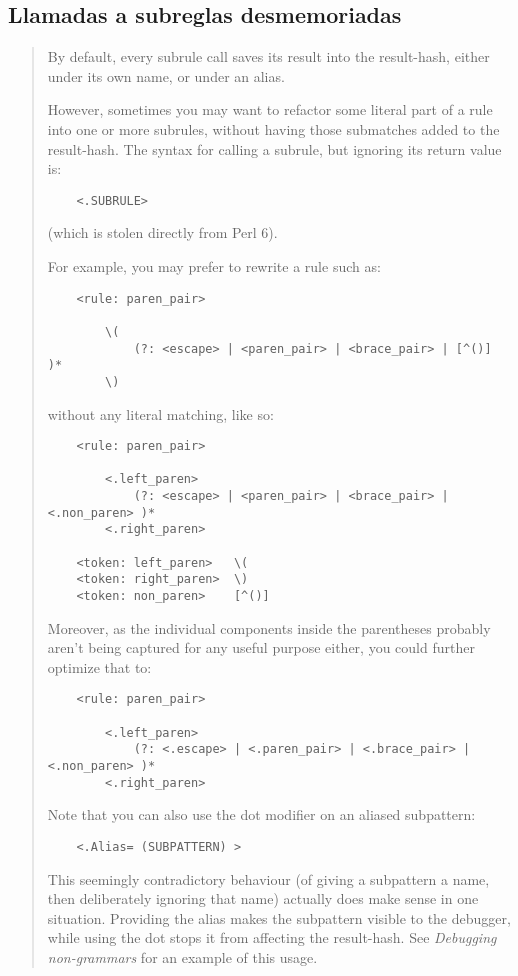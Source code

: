 \subsection{Llamadas a subreglas desmemoriadas}

\begin{it}\begin{quotation}
By default, every subrule call saves its result into the result-hash,
either under its own name, or under an alias.

However, sometimes you may want to refactor some literal part of a rule
into one or more subrules, without having those submatches added to the
result-hash. The syntax for calling a subrule, but ignoring its return
value is:

\begin{verbatim}
    <.SUBRULE>
\end{verbatim}

(which is stolen directly from Perl 6).

For example, you may prefer to rewrite a rule such as:

\begin{verbatim}
    <rule: paren_pair> 

        \( 
            (?: <escape> | <paren_pair> | <brace_pair> | [^()] )*
        \)
\end{verbatim}

without any literal matching, like so:

\begin{verbatim}
    <rule: paren_pair> 

        <.left_paren>
            (?: <escape> | <paren_pair> | <brace_pair> | <.non_paren> )*
        <.right_paren>
    
    <token: left_paren>   \(
    <token: right_paren>  \)
    <token: non_paren>    [^()]
\end{verbatim}

Moreover, as the individual components inside the parentheses probably
aren't being captured for any useful purpose either, you could further
optimize that to:

\begin{verbatim}
    <rule: paren_pair> 

        <.left_paren>
            (?: <.escape> | <.paren_pair> | <.brace_pair> | <.non_paren> )*
        <.right_paren>
\end{verbatim}

Note that you can also use the dot modifier on an aliased subpattern:

\begin{verbatim}
    <.Alias= (SUBPATTERN) >
\end{verbatim}

This seemingly contradictory behaviour (of giving a subpattern a name,
then deliberately ignoring that name) actually does make sense in
one situation. Providing the alias makes the subpattern visible to the
debugger, while using the dot stops it from affecting the result-hash. See
\emph{Debugging non-grammars} for an example of this usage.
\end{quotation}\end{it}

